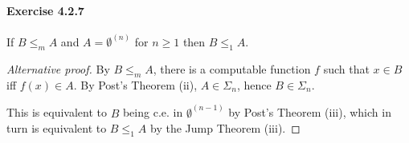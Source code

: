 \documentclass[a4paper,11pt]{article}
\begin{document}
\paragraph{Exercise 4.2.7}

If $B \leq_m A$ and $A = \emptyset^{(n)}$ for $n \geq 1$ then $B \leq_1 A$.
\begin{proof}[Alternative proof]
By $B \leq_m A$, there is a computable function $f$ such that $x \in B$ iff $f(x) \in A$.
By Post's Theorem (ii), $A \in \Sigma_n$, hence $B \in \Sigma_n$.

This is equivalent to $B$ being c.e. in $\emptyset^{(n-1)}$ by Post's Theorem (iii), which in turn is equivalent to $B \leq_1 A$ by the Jump Theorem (iii).
\end{proof}

\end{document}
